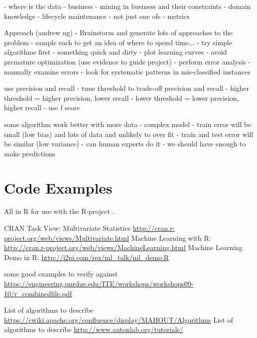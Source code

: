 \begin{bibunit}
- where is the data - business
- mining in business and their constraints
- domain knowledge
- lifecycle maintenance - not just one ofs
- metrics

Approach (andrew ng)
- Brainstorm and generate lots of approaches to the problem - sample each to get an idea of where to spend time...
- try simple algorithms first - something quick and dirty
- plot learning curves
	- avoid premature optimization (use evidence to guide project)
- perform error analysis
	- manually examine errors
	- look for systematic patterns in mis-classified instances

use precision and recall
- tune threshold to trade-off precision and recall
	- higher threshold = higher precision, lower recall
	- lower threshold = lower precision, higher recall
- use f score

some algorithm work better with more data
- complex model - train error will be small (low bias) and lots of data and unlikely to over fit - train and test error will be similar (low variance)
- can human experts do it - we should have enough to make predictions


\section{Code Examples}

All in R for use with the R-project \cite{RDevelopmentCoreTeam2011}.

CRAN Task View: Multivariate Statistics \url{http://cran.r-project.org/web/views/Multivariate.html}
Machine Learning with R: \url{http://cran.r-project.org/web/views/MachineLearning.html}
Machine Learning Demo in R: \url{http://i2pi.com/rez/ml_talk/ml_demo.R}

some good examples to verify against \url{https://engineering.purdue.edu/ITE/workshops/workshops09-10/r_combinedfile.pdf}

List of algorithms to describe \url{https://cwiki.apache.org/confluence/display/MAHOUT/Algorithms}
List of algorithms to describe \url{http://www.autonlab.org/tutorials/}

\renewcommand{\bibsection}{\section{\bibname}}
\putbib
\end{bibunit}
